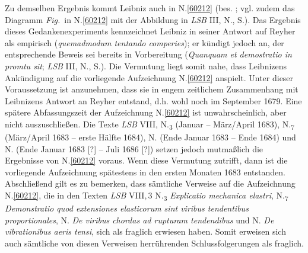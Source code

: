 \begin{ledgroup}
Zu demselben Ergebnis kommt Leibniz auch in N.\;\ref{60212} (bes. ;
vgl. zudem das Diagramm \lbrack\textit{Fig.}\rbrack\ in N.\;\ref{60212} mit der Abbildung in \textit{LSB} III, N., S.).\cite{01435}
Das Ergebnis dieses Gedankenexperiments kennzeichnet Leibniz in seiner Antwort auf Reyher als empirisch (\textit{quemadmodum tentando comperies}); er kündigt jedoch an, der entsprechende Beweis sei bereits in Vorbereitung (\textit{Quanquam et demostratio in promtu sit}; \textit{LSB} III, N., S.).\cite{01435}
Die Vermutung liegt somit nahe, dass Leibnizens Ankündigung auf die vorliegende Aufzeichnung N.\;\ref{60212} anspielt.
Unter dieser Voraussetzung ist anzunehmen, dass sie in engem zeitlichem Zusammenhang mit Leibnizens Antwort an Reyher entstand, d.h. wohl noch im September 1679.
\pend%
\pstart%
Eine spätere Abfassungszeit der Aufzeichnung N.\;\ref{60212} ist unwahrscheinlich, aber nicht auszuschließen.
Die Texte
\textit{LSB} VIII, N.\textsubscript{3} (Januar -- März/April 1683),\cite{01437}
N.\textsubscript{7} (März/April 1683 -- erste Hälfte 1684),\cite{01438}
N. (Ende Januar 1683 -- Ende 1684)\cite{01439}
und N. (Ende Januar 1683 [?] -- Juli 1686 [?])\cite{01440}
setzen jedoch mutmaßlich die Ergebnisse von N.\;\ref{60212} voraus.
Wenn diese Vermutung zutrifft, dann ist die vorliegende Aufzeichnung spätestens in den ersten Monaten 1683 entstanden.
\pend%
\pstart%
Abschließend gilt es zu bemerken, dass sämtliche Verweise auf die Aufzeichnung N.\;\ref{60212}, die in den Texten  \textit{LSB} VIII,\,3 N.\textsubscript{3}\cite{01437} \textit{Explicatio mechanica elastri}, N.\textsubscript{7}\cite{01438} \textit{Demonstratio quod extensiones elasticorum sint viribus tendentibus proportionales}, N.\cite{01439} \textit{De viribus chordas ad rupturam tendendibus} und N.\cite{01440} \textit{De vibrationibus aeris tensi}, sich als fraglich erwiesen haben.
Somit erweisen sich auch sämtliche von diesen Verweisen herrührenden Schlussfolgerungen als fraglich.
\pend%
\end{ledgroup}%
%
\frenchspacing%
\normalsize%
\newpage%

